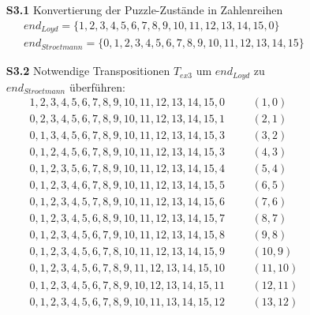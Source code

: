 \begin{figure}[H]
	\begin{enumerate}
		\item[\textbf{S3.1}] Konvertierung der Puzzle-Zustände in Zahlenreihen
		      \begin{align*}
			      end_{Loyd} = \{1,2,3,4,5,6,7,8,9,10,11,12,13,14,15,0\} \\
			      end_{Stroetmann} = \{0,1,2,3,4,5,6,7,8,9,10,11,12,13,14,15\}
		      \end{align*}
		\item[\textbf{S3.2}] Notwendige Transpositionen $T_{ex3}$ um $end_{Loyd}$ zu $end_{Stroetmann}$ überführen:
		      \begin{align*}
			      1,2,3,4,5,6,7,8,9,10,11,12,13,14,15,0 & \hspace{20pt} (1,0)   \\
			      0,2,3,4,5,6,7,8,9,10,11,12,13,14,15,1 & \hspace{20pt} (2,1)   \\
			      0,1,3,4,5,6,7,8,9,10,11,12,13,14,15,3 & \hspace{20pt} (3,2)   \\
			      0,1,2,4,5,6,7,8,9,10,11,12,13,14,15,3 & \hspace{20pt} (4,3)   \\
			      0,1,2,3,5,6,7,8,9,10,11,12,13,14,15,4 & \hspace{20pt} (5,4)   \\
			      0,1,2,3,4,6,7,8,9,10,11,12,13,14,15,5 & \hspace{20pt} (6,5)   \\
			      0,1,2,3,4,5,7,8,9,10,11,12,13,14,15,6 & \hspace{20pt} (7,6)   \\
			      0,1,2,3,4,5,6,8,9,10,11,12,13,14,15,7 & \hspace{20pt} (8,7)   \\
			      0,1,2,3,4,5,6,7,9,10,11,12,13,14,15,8 & \hspace{20pt} (9,8)   \\
			      0,1,2,3,4,5,6,7,8,10,11,12,13,14,15,9 & \hspace{20pt} (10,9)  \\
			      0,1,2,3,4,5,6,7,8,9,11,12,13,14,15,10 & \hspace{20pt} (11,10) \\
			      0,1,2,3,4,5,6,7,8,9,10,12,13,14,15,11 & \hspace{20pt} (12,11) \\
			      0,1,2,3,4,5,6,7,8,9,10,11,13,14,15,12 & \hspace{20pt} (13,12) \\

\end{align*}
\end{enumerate}
\end{figure}

